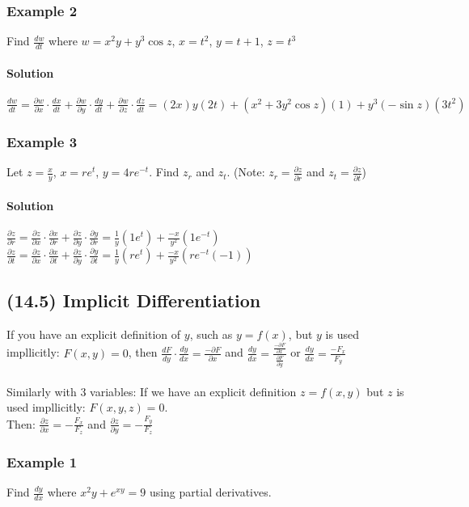 \documentclass{article}
\newcommand{\p}{\partial}
\begin{document}
\subsubsection{Example 2}
Find $\frac{dw}{dt}$ where $w=x^2y+y^3\cos{z}$, $x=t^2$, $y=t+1$, $z=t^3$
\paragraph{Solution} $\frac{dw}{dt}=\frac{\p w}{\p x}\cdot\frac{dx}{dt}+\frac{\p w}{\p y}\cdot\frac{dy}{dt}+\frac{\p w}{\p z}\cdot\frac{dz}{dt}
=(2x)y(2t)+(x^2+3y^2\cos{z})(1)+y^3(-\sin{z})(3t^2)$

\subsubsection{Example 3}
Let $z=\frac{x}{y}$, $x=re^t$, $y=4re^{-t}$. Find $z_r$ and $z_t$. (Note: $z_r=\frac{\p z}{\p r}$ and $z_t=\frac{\p z}{\p t}$)
\paragraph{Solution}
$\frac{\p z}{\p r}=\frac{\p z}{\p x}\cdot\frac{\p x}{\p r}+\frac{\p z}{\p y}\cdot\frac{\p y}{\p r}
=\frac{1}{y}(1e^t)+\frac{-x}{y^2}(1e^{-t})$
\\$\frac{\p z}{\p t}=\frac{\p z}{\p x}\cdot\frac{\p x}{\p t}+\frac{\p z}{\p y}\cdot\frac{\p y}{\p t}
=\frac{1}{y}(re^t)+\frac{-x}{y^2}(re^{-t}(-1))$

\newpage\subsection{(14.5) Implicit Differentiation}
If you have an explicit definition of $y$, such as $y=f(x)$, but $y$ is used impllicitly: $F(x,y)=0$,
then $\frac{dF}{dy}\cdot\frac{dy}{dx}=\frac{-\p F}{\p x}$ and $\frac{dy}{dx}=\frac{\frac{-\p F}{\p x}}{\frac{\p F}{\p y}}$
or $\frac{dy}{dx}=\frac{-F_x}{F_y}$
\\\\Similarly with 3 variables: If we have an explicit definition $z=f(x,y)$ but $z$ is used impllicitly: $F(x,y,z)=0$.
\\Then: $\frac{\p z}{\p x}=-\frac{F_x}{F_z}$ and $\frac{\p z}{\p y}=-\frac{F_y}{F_z}$

\subsubsection{Example 1} Find $\frac{dy}{dx}$ where $x^2y+e^{xy}=9$ using partial derivatives.
\end{document}
